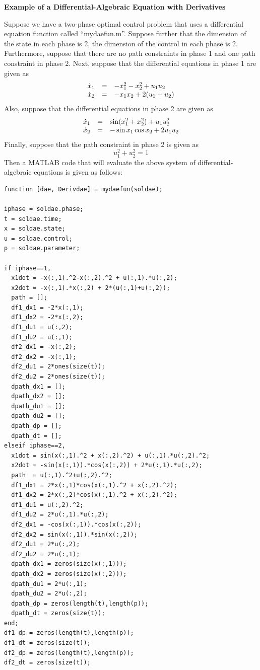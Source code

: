 \documentclass[10pt]{article}
\newenvironment{shadedframe}{%
  \def\FrameCommand{\fcolorbox{black}{shadecolor}}%
  \MakeFramed {\FrameRestore}}
{\endMakeFramed}
\begin{document}
\scriptsize
\begin{shadedframe}
{\noindent}{\bf Example of a Differential-Algebraic Equation with Derivatives}
\vspace{12pt}

Suppose we have a two-phase optimal control problem that uses a differential
equation function called ``mydaefun.m''.  Suppose further that the dimension
of the state in each phase is 2, the dimension of the control in each
phase is 2.  Furthermore, suppose that there are no path constraints
in phase 1 and one path constraint in phase 2.  Next, suppose that
the differential equations in phase 1 are given as
\begin{displaymath}
  \begin{array}{lcl}
    \dot{x}_1 & = & -x_1^2-x_2^2 + u_1 u_2 \\
    \dot{x}_2 & = & -x_1x_2 + 2(u_1+u_2)
  \end{array}
\end{displaymath}
Also, suppose that the differential equations in phase 2 are given as
\begin{displaymath}
  \begin{array}{lcl}
    \dot{x}_1 & = & \sin(x_1^2+x_2^2) + u_1 u_2^2 \\
    \dot{x}_2 & = & -\sin x_1 \cos x_2 + 2u_1u_2
  \end{array}
\end{displaymath}
Finally, suppose that the path constraint in phase 2 is given as
\begin{displaymath}
  u_1^2+u_2^2 = 1
\end{displaymath}
Then a MATLAB code that will evaluate the above system of
differential-algebraic equations is given as follows:
\begin{verbatim}
function [dae, Derivdae] = mydaefun(soldae);

iphase = soldae.phase;
t = soldae.time;
x = soldae.state;
u = soldae.control;
p = soldae.parameter;

if iphase==1,
  x1dot = -x(:,1).^2-x(:,2).^2 + u(:,1).*u(:,2);
  x2dot = -x(:,1).*x(:,2) + 2*(u(:,1)+u(:,2));
  path = [];
  df1_dx1 = -2*x(:,1);
  df1_dx2 = -2*x(:,2);
  df1_du1 = u(:,2);
  df1_du2 = u(:,1);
  df2_dx1 = -x(:,2);
  df2_dx2 = -x(:,1);
  df2_du1 = 2*ones(size(t));
  df2_du2 = 2*ones(size(t));
  dpath_dx1 = [];
  dpath_dx2 = [];
  dpath_du1 = [];
  dpath_du2 = [];
  dpath_dp = [];
  dpath_dt = [];
elseif iphase==2,
  x1dot = sin(x(:,1).^2 + x(:,2).^2) + u(:,1).*u(:,2).^2;
  x2dot = -sin(x(:,1)).*cos(x(:,2)) + 2*u(:,1).*u(:,2);
  path  = u(:,1).^2+u(:,2).^2;
  df1_dx1 = 2*x(:,1)*cos(x(:,1).^2 + x(:,2).^2);
  df1_dx2 = 2*x(:,2)*cos(x(:,1).^2 + x(:,2).^2);
  df1_du1 = u(:,2).^2;
  df1_du2 = 2*u(:,1).*u(:,2);
  df2_dx1 = -cos(x(:,1)).*cos(x(:,2));
  df2_dx2 = sin(x(:,1)).*sin(x(:,2));
  df2_du1 = 2*u(:,2);
  df2_du2 = 2*u(:,1);
  dpath_dx1 = zeros(size(x(:,1)));
  dpath_dx2 = zeros(size(x(:,2)));
  dpath_du1 = 2*u(:,1);
  dpath_du2 = 2*u(:,2);
  dpath_dp = zeros(length(t),length(p));
  dpath_dt = zeros(size(t));
end;
df1_dp = zeros(length(t),length(p));
df1_dt = zeros(size(t));
df2_dp = zeros(length(t),length(p));
df2_dt = zeros(size(t));


\end{verbatim}
\end{shadedframe}
\end{document}
